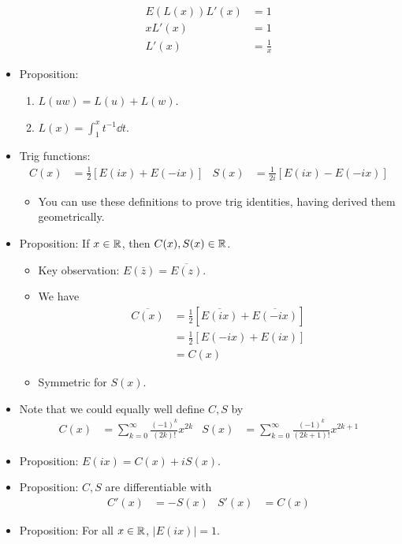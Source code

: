 \documentclass[../notes.tex]{subfiles}
\begin{document}
\begin{itemize}
\begin{align*}
        E(L(x))L'(x) &= 1\\
        xL'(x) &= 1\\
        L'(x) &= \frac{1}{x}
    \end{align*}
    \item Proposition:
    \begin{enumerate}
        \item $L(uw)=L(u)+L(w)$.
        \item $L(x)=\int_1^xt^{-1}\dd{t}$.
    \end{enumerate}
    \item Trig functions:
    \begin{align*}
        C(x) &= \frac{1}{2}[E(ix)+E(-ix)]&
        S(x) &= \frac{1}{2i}[E(ix)-E(-ix)]
    \end{align*}
    \begin{itemize}
        \item You can use these definitions to prove trig identities, having derived them geometrically.
    \end{itemize}
    \item Proposition: If $x\in\mathbb{R}$, then $C(x),S(x)\in\mathbb{R}$.
    \begin{itemize}
        \item Key observation: $E(\bar{z})=\overline{E(z)}$.
        \item We have
        \begin{align*}
            \overline{C(x)} &= \frac{1}{2}[\overline{E(ix)}+\overline{E(-ix)}]\\
            &= \frac{1}{2}[E(-ix)+E(ix)]\\
            &= C(x)
        \end{align*}
        \item Symmetric for $S(x)$.
    \end{itemize}
    \item Note that we could equally well define $C,S$ by
    \begin{align*}
        C(x) &= \sum_{k=0}^\infty\frac{(-1)^k}{(2k)!}x^{2k}&
        S(x) &= \sum_{k=0}^\infty\frac{(-1)^k}{(2k+1)!}x^{2k+1}
    \end{align*}
    \item Proposition: $E(ix)=C(x)+iS(x)$.
    \item Proposition: $C,S$ are differentiable with
    \begin{align*}
        C'(x) &= -S(x)&
        S'(x) &= C(x)
    \end{align*}
    \item Proposition: For all $x\in\mathbb{R}$, $|E(ix)|=1$.

\end{itemize}
\end{document}

